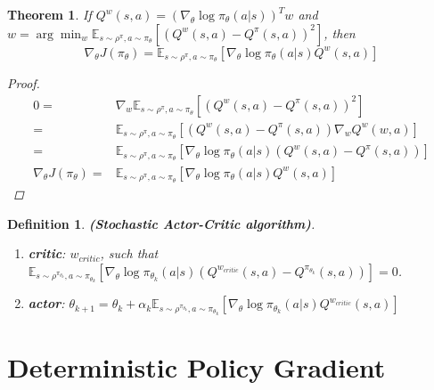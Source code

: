 \documentclass[a4paper]{article}
\newtheorem{theorem}{Theorem}
\newtheorem{definition}{Definition}
\begin{document}
\begin{theorem}
    If $ Q^w(s,a) = {(\nabla_\theta \log \pi_\theta(a|s))}^T w $
    and $ w = \arg\min_w \mathbb{E} _{s\sim \rho^\pi, a \sim \pi_\theta} \left[ {\left( Q^w(s,a) - Q^\pi(s,a) \right)}^2 \right] $,
    then
    \[
        \nabla_\theta J(\pi_\theta) = \mathbb{E}_{s\sim \rho^\pi, a \sim \pi_\theta}
        [\nabla_\theta \log \pi_\theta(a|s) Q^w(s,a)]
    \]
    \begin{proof}
        \begin{align*}
            0 =& \nabla_w \mathbb{E} _{s\sim \rho^\pi, a \sim \pi_\theta} \left[ {\left( Q^w(s,a) - Q^\pi(s,a) \right)}^2 \right] \\
            =& \mathbb{E} _{s\sim \rho^\pi, a \sim \pi_\theta} \left[ {\left( Q^w(s,a) - Q^\pi(s,a) \right)} \nabla_w Q^w(w,a) \right] \\
            =& \mathbb{E} _{s\sim \rho^\pi, a \sim \pi_\theta} \left[ \nabla_\theta \log \pi_\theta(a|s) {\left( Q^w(s,a) - Q^\pi(s,a) \right)} \right] \\
            \nabla_\theta J(\pi_\theta) 
            =& \mathbb{E}_{s\sim \rho^\pi, a \sim \pi_\theta} [\nabla_\theta \log \pi_\theta(a|s) Q^w(s,a)]
        \end{align*}
    \end{proof}
\end{theorem}

\begin{definition}
    \textbf{(Stochastic Actor-Critic algorithm)}.
    \begin{enumerate}
        \item \textbf{critic}: $ w_{critic} $, such that $ \mathbb{E}_{s\sim \rho^{\pi_{\theta_k}}, a \sim \pi_{\theta_k}} \left[ \nabla_{\theta} \log \pi_{\theta_k} (a|s) {\left( Q^{w_{critic}}(s,a) - Q^{\pi_{\theta_k}} (s,a) \right)} \right]=0 $.
        \item \textbf{actor}: $ \theta_{k+1} = \theta_k + \alpha_k  \mathbb{E}_{s\sim \rho^{\pi_{\theta_k}}, a \sim \pi_{\theta_k}} [\nabla_\theta \log \pi_{\theta_k}(a|s) Q^{w_{critic}}(s,a)]$ 
    \end{enumerate}
\end{definition}

\section{Deterministic Policy Gradient~\cite{silver2014deterministic}}%
\label{sec:deterministic_policy_gradient}
\end{document}
